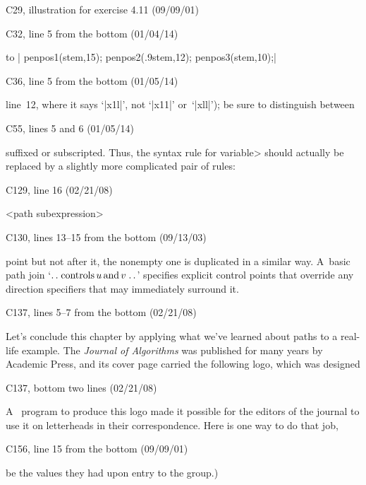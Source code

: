 {{\bugonpage C29, illustration for exercise 4.11 (09/09/01)


\bugonpage C32, line 5 from the bottom (01/04/14)

\noindent
\hbox to\parindent{\hfil\sevenrm20\ \ }%
|  penpos1(stem,15); penpos2(.9stem,12); penpos3(stem,10);|

\bugonpage C36, line 5 from the bottom (01/05/14)

\noindent
line~12, where it
says `|x1l|', not `|x11|' or~`|xll|'); be sure to distinguish between\cutpar

\bugonpage C55, lines 5 and 6 (01/05/14)

\ninepoint\noindent
suffixed or subscripted.
Thus, the syntax rule for \<variable>
should actually be replaced by a slightly more complicated pair of rules:


\bugonpage C129, line 16 (02/21/08)

\ninepoint\beginsyntax
<path subexpression>\kern-5pt\null
\endsyntax

\bugonpage C130, lines 13--15 from the bottom (09/13/03)

\ninepoint\noindent
point but not after it, the
nonempty one is duplicated in a similar way. A~basic path join
`$\mathrel{.\,.}\mathop{\rm controls} u\,{\rm and}\, v\mathrel{.\,.}$' specifies explicit control points that
override any direction specifiers that may immediately surround it.

\bugonpage C137, lines 5--7 from the bottom (02/21/08)

\danger Let's conclude this chapter by applying what we've learned about
paths to a real-life example. The {\sl Journal of Algorithms\/} was
published for many years by Academic Press, and its cover page carried the
following logo, which was designed\cutpar
\enddanger

\bugonpage C137, bottom two lines (02/21/08)

\ninepoint\noindent
A \MF\ program to produce this logo made it possible for the editors
of the journal to use it on letterheads in their correspondence.
Here is one way to do that job,\cutpar

\bugonpage C156, line 15 from the bottom (09/09/01)

\ninepoint\noindent
be the values they had upon entry to the group.)

}}
